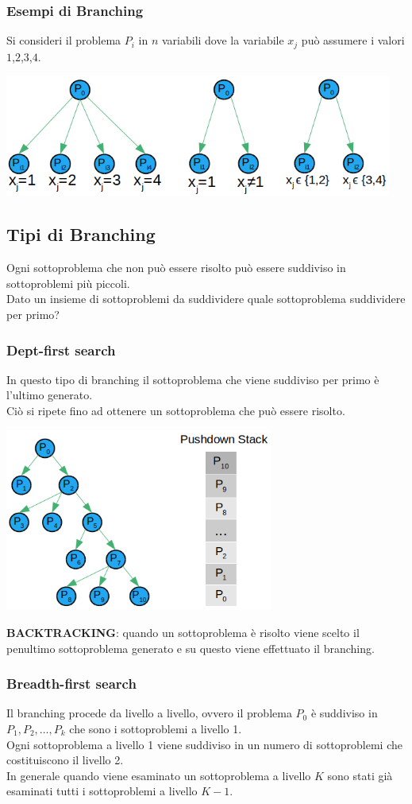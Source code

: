 \subsubsection{Esempi di Branching}
Si consideri il problema $P_{i}$ in $n$ variabili dove la variabile $x_{j}$ può assumere i valori $1$,$2$,$3$,$4$.
\centerline{\includegraphics[height=4cm]{images/graph16.png}}

\clearpage
\subsection{Tipi di Branching}
Ogni sottoproblema che non può essere risolto può essere suddiviso in sottoproblemi più piccoli.\\
Dato un insieme di sottoproblemi da suddividere quale sottoproblema suddividere per primo?
\subsubsection{Dept-first search}
In 	questo tipo di branching il sottoproblema che viene suddiviso per primo è l'ultimo generato.\\
Ciò si ripete fino ad ottenere un sottoproblema che può essere risolto.

\centerline{\includegraphics[height=6cm]{images/graph17.png}}

\textbf{BACKTRACKING}: quando un sottoproblema è risolto viene scelto il penultimo sottoproblema generato e su questo viene effettuato il branching.

\subsubsection{Breadth-first search}
Il branching procede da livello a livello, ovvero il problema $P_{0}$ è suddiviso in $P_{1},P_{2},\dots,P_{k}$ che sono i sottoproblemi a livello 1.\\
Ogni sottoproblema a livello 1 viene suddiviso in un numero di sottoproblemi che costituiscono il livello 2.\\
In generale quando viene esaminato un sottoproblema a livello $K$ sono stati già esaminati tutti i sottoproblemi a livello $K-1$.

